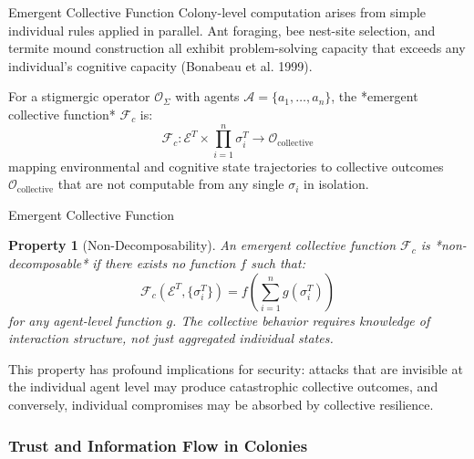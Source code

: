 \documentclass[
  ignorenonframetext,
]{beamer}
\newtheorem{property}{Property}
\begin{document}
\begin{frame}[allowframebreaks]{Emergent Collective Function}
Colony-level computation arises from simple individual rules applied in
parallel. Ant foraging, bee nest-site selection, and termite mound
construction all exhibit problem-solving capacity that exceeds any
individual's cognitive capacity (Bonabeau et al. 1999).

\begin{definition}
\label{def:emergent-function}
For a stigmergic operator $\mathcal{O}_\Sigma$ with agents $\mathcal{A} = \{a_1, \ldots, a_n\}$, the *emergent collective function* $\mathcal{F}_c$ is:
\begin{equation}
\label{eq:emergent-function}
\mathcal{F}_c: \mathcal{E}^T \times \prod_{i=1}^n \sigma_i^T \to \mathcal{O}_{\text{collective}}
\end{equation}
mapping environmental and cognitive state trajectories to collective outcomes $\mathcal{O}_{\text{collective}}$ that are not computable from any single $\sigma_i$ in isolation.
\end{definition}

\end{frame}

\begin{frame}[allowframebreaks]{Emergent Collective Function}
\begin{property}[Non-Decomposability]
\label{prop:non-decomposable}
An emergent collective function $\mathcal{F}_c$ is *non-decomposable* if there exists no function $f$ such that:
\begin{equation}
\mathcal{F}_c(\mathcal{E}^T, \{\sigma_i^T\}) = f\left(\sum_{i=1}^n g(\sigma_i^T)\right)
\label{eq:non-decomposability}
\end{equation}
for any agent-level function $g$. The collective behavior requires knowledge of interaction structure, not just aggregated individual states.
\end{property}

This property has profound implications for security: attacks that are
invisible at the individual agent level may produce catastrophic
collective outcomes, and conversely, individual compromises may be
absorbed by collective resilience.
\end{frame}

\subsubsection{Trust and Information Flow in
Colonies}\label{sec:colony-trust}
\end{document}
